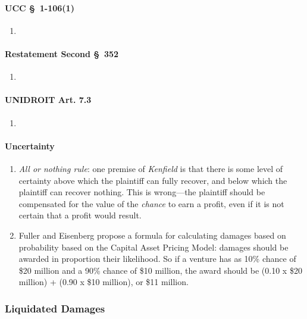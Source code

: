 \paragraph{UCC \S\ 1-106(1)}

\begin{enumerate}
    \item %
\end{enumerate}

\paragraph{Restatement Second \S\ 352}

\begin{enumerate}
    \item %
\end{enumerate}

\paragraph{UNIDROIT Art. 7.3}

\begin{enumerate}
    \item %
\end{enumerate}

\paragraph{Uncertainty}

\begin{enumerate}
    \item \emph{All or nothing rule}: one premise of \emph{Kenfield} is that 
    there is some level of certainty above which the plaintiff can fully 
    recover, and below which the plaintiff can recover nothing. This is 
    wrong---the plaintiff should be compensated for the value of the 
    \emph{chance} to earn a profit, even if it is not certain that a profit 
    would result.
    \item Fuller and Eisenberg propose a formula for calculating damages based 
    on probability based on the Capital Asset Pricing Model: damages should be 
    awarded in proportion their likelihood.  So if a venture has as 10\% 
    chance of \$20 million and a 90\% chance of \$10 million, the award should 
    be (0.10 x \$20 million) + (0.90 x \$10 million), or \$11 million.
\end{enumerate}

\subsubsection{Liquidated Damages}

